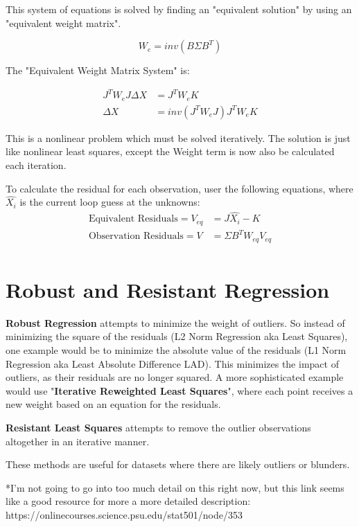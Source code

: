 This system of equations is solved by finding an "equivalent solution" by using an "equivalent weight matrix".

\[
W_e = inv(B \Sigma B^T)
\]

The "Equivalent Weight Matrix System" is:

\begin{align*}
J^TW_eJ\Delta X &= J^TW_eK \\
\Delta X &= inv(J^TW_eJ)J^TW_eK 
\end{align*}

This is a nonlinear problem which must be solved iteratively.  The solution is just like nonlinear least squares, except the Weight term is now also be calculated each iteration.

To calculate the residual for each observation, user the following equations, where $\hat{X_i}$ is the current loop guess at the unknowns:
\begin{align*}
	\text{Equivalent Residuals} = V_{eq} &= J\hat{X_i} - K \\
	\text{Observation Residuals} = V &= \Sigma B^T W_{eq} V_{eq} \\
\end{align*}

\section{Robust and Resistant Regression}
\textbf{Robust Regression} attempts to minimize the weight of outliers.  So instead of minimizing the square of the residuals (L2 Norm Regression aka Least Squares), one example would be to minimize the absolute value of the residuals (L1 Norm Regression aka Least Absolute Difference LAD).  This minimizes the impact of outliers, as their residuals are no longer squared.  A more sophisticated example would use "\textbf{Iterative Reweighted Least Squares}", where each point receives a new weight based on an equation for the residuals.
\vspace{0.5cm}

\noindent
\textbf{Resistant Least Squares} attempts to remove the outlier observations altogether in an iterative manner.  

\vspace{0.5cm}
\noindent
These methods are useful for datasets where there are likely outliers or blunders.

\vspace{0.5cm}
\noindent
*I'm not going to go into too much detail on this right now, but this link seems like a good resource for more a more detailed description: https://onlinecourses.science.psu.edu/stat501/node/353
